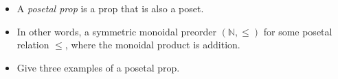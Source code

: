 
\begin{itemize}
    \item A \emph{posetal prop} is a prop that is also a poset.
    \item In other words, a symmetric monoidal preorder $(\mathbb{N}, \leq)$ for some posetal relation $\leq$, where the monoidal product is addition.
    \item Give three examples of a posetal prop.
  \end{itemize}